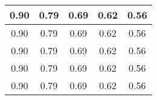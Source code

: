 \begin{large}\begin{tabular}{|c|c|c|c|c|}
\hline
0.90&0.79&0.69&0.62&0.56\\\hline
0.90&0.79&0.69&0.62&0.56\\\hline
0.90&0.79&0.69&0.62&0.56\\\hline
0.90&0.79&0.69&0.62&0.56\\\hline
0.90&0.79&0.69&0.62&0.56\\\hline
\end{tabular}
\end{large}